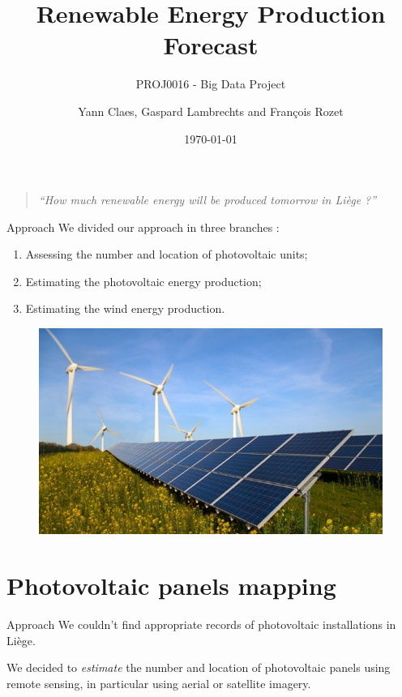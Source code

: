 \documentclass[12pt]{beamer}
\title{Renewable Energy Production Forecast}
\subtitle{PROJ0016 - Big Data Project}
\author{Yann Claes, Gaspard Lambrechts and François Rozet}
\institute{University of Liège}
\date{\today}
\begin{document}
\maketitle

\begin{frame}[standout]
    \vspace{1em}
    \begin{quote}
        \emph{\enquote{How much renewable energy will be produced tomorrow in Liège ?}}
    \end{quote}
\end{frame}

\begin{frame}{Approach}
    We divided our approach in three branches :
    \begin{enumerate}
        \item Assessing the number and location of photovoltaic units;
        \item Estimating the photovoltaic energy production;
        \item Estimating the wind energy production.
    \end{enumerate}
    \begin{figure}
        \centering
        \vspace{-1em}
        \includegraphics[height=0.4\textheight]{resources/jpg/temp.jpeg}
        \vspace{-1em}
    \end{figure}
\end{frame}

\section{Photovoltaic panels mapping}

\begin{frame}{Approach}
    We couldn't find appropriate records of photovoltaic installations in Liège.
    
    We decided to \emph{estimate} the number and location of photovoltaic panels using \alert{remote sensing}, in particular using \alert{aerial} or \alert{satellite} imagery.
\end{frame}
\end{document}
